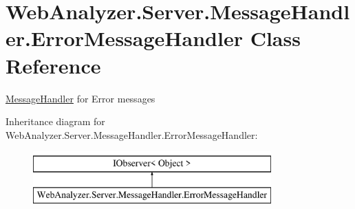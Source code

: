 \hypertarget{class_web_analyzer_1_1_server_1_1_message_handler_1_1_error_message_handler}{}\section{Web\+Analyzer.\+Server.\+Message\+Handler.\+Error\+Message\+Handler Class Reference}
\label{class_web_analyzer_1_1_server_1_1_message_handler_1_1_error_message_handler}


\hyperlink{namespace_web_analyzer_1_1_server_1_1_message_handler}{Message\+Handler} for Error messages  


Inheritance diagram for Web\+Analyzer.\+Server.\+Message\+Handler.\+Error\+Message\+Handler\+:\begin{figure}[H]
\begin{center}
\leavevmode
\includegraphics[height=2.000000cm]{class_web_analyzer_1_1_server_1_1_message_handler_1_1_error_message_handler}
\end{center}
\end{figure}
